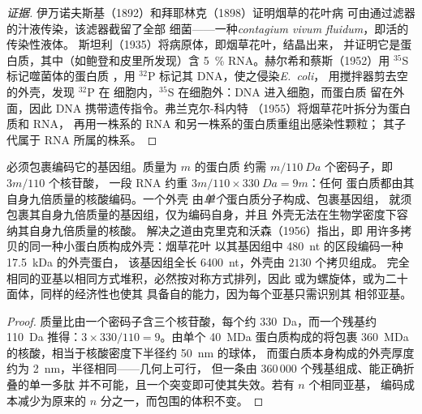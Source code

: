 \begin{proof}[证据]
伊万诺夫斯基（1892）和拜耶林克（1898）证明烟草的花叶病
可由通过滤器的汁液传染，该滤器截留了全部
细菌——一种\emph{contagium vivum fluidum}，即活的传染性液体。
斯坦利（1935）将病原体，即烟草花叶，结晶出来，
并证明它是蛋白质，其中（如鲍登和皮里所发现）含 \qty{5}{\%}
RNA。赫尔希和蔡斯（1952）用 $^{35}$S 标记噬菌体的蛋白质
，用 $^{32}$P 标记其 DNA，使之侵染\emph{E.~coli}，
用搅拌器剪去空的外壳，发现 $^{32}$P 在
细胞内，$^{35}$S 在细胞外：DNA 进入细胞，而蛋白质
留在外面，因此 DNA 携带遗传指令。弗兰克尔-科内特
（1955）将烟草花叶拆分为蛋白质和 RNA，
再用一株系的 RNA 和另一株系的蛋白质重组出感染性颗粒；
其子代属于 RNA 所属的株系。
\end{proof}

\begin{proposition}\label{prop:b3:virology:economy}
必须包裹编码它的基因组。质量为 $m$ 的蛋白质
约需 $m/\qty{110}{Da}$ 个密码子，即 $3m/110$ 个核苷酸，
一段 RNA 约重 $3m/110\times\qty{330}{Da} = 9m$：任何
蛋白质都由其自身九倍质量的核酸编码。一个外壳
由\emph{单个}蛋白质分子构成、包裹基因组，
就须包裹其自身九倍质量的基因组，仅为编码自身，并且
外壳无法在生物学密度下容纳其自身九倍质量的核酸。
解决之道由克里克和沃森（1956）指出，即
用许多拷贝的同一种小蛋白质构成外壳：烟草花叶
以其基因组中 \qty{480}{nt} 的区段编码一种 \qty{17.5}{kDa} 的外壳蛋白，
该基因组全长 \qty{6400}{nt}，外壳由 $2130$ 个拷贝组成。
完全相同的亚基以相同方式堆积，必然按对称方式排列，因此
或为螺旋体，或为二十面体，同样的经济性也使其
具备自的能力，因为每个亚基只需识别其
相邻亚基。
\end{proposition}
\begin{proof}
质量比由一个密码子含三个核苷酸，每个约
\qty{330}{Da}，而一个残基约 \qty{110}{Da} 推得：$3\times 330/110 =
9$。由单个 \qty{40}{MDa} 蛋白质构成的将包裹 \qty{360}{MDa}
的核酸，相当于核酸密度下半径约 \qty{50}{nm} 的球体，
而蛋白质本身构成的外壳厚度约为
\qty{2}{nm}，半径相同——几何上可行，
但一条由 $360\,000$ 个残基组成、能正确折叠的单一多肽
并不可能，且一个突变即可使其失效。若有 $n$ 个相同亚基，
编码成本减少为原来的 $n$ 分之一，而包围的体积不变。
\end{proof}

